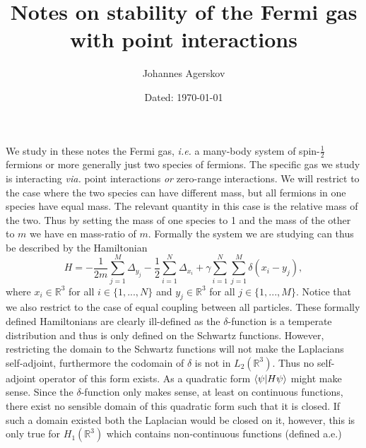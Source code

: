 \documentclass[a4paper,11pt]{article}
\author{Johannes Agerskov}
\date{Dated: \today}
\title{Notes on stability of the Fermi gas with point interactions}
\newcommand{\ie}{\emph{i.e.} }
\begin{document}
	\maketitle
	\tableofcontents
\vspace{1cm}
We study in these notes the Fermi gas, \ie a many-body system of spin-$ \frac{1}{2} $ fermions or more generally just two species of fermions. The specific gas we study is interacting \emph{via.} point interactions \emph{or} zero-range interactions. We will restrict to the case where the two species can have different mass, but all fermions in one species have equal mass. The relevant quantity in this case is the relative mass of the two. Thus by setting the mass of one species to 1 and the mass of the other to $ m $ we have en mass-ratio of $ m $. Formally the system we are studying can thus be described by the Hamiltonian \begin{equation}\label{Formal Hamiltonian}
H=-\frac{1}{2m}\sum_{j=1}^{M}\Delta_{y_j}-\frac{1}{2}\sum_{i=1}^{N}\Delta_{x_i}+\gamma\sum_{i=1}^{N}\sum_{j=1}^{M}\delta(x_i-y_j),
\end{equation}
where $ x_i\in\mathbb{R}^3 $ for all $ i\in\{1,...,N\} $ and $ y_j\in\mathbb{R}^3 $ for all $ j\in\{1,...,M\} $. Notice that we also restrict to the case of equal coupling between all particles. These formally defined Hamiltonians are clearly ill-defined as the $ \delta $-function is a  temperate distribution and thus is only defined on the Schwartz functions. However, restricting the domain to the Schwartz functions will not make the Laplacians self-adjoint, furthermore the codomain of $ \delta $ is not in $ L_2(\mathbb{R}^3) $. Thus no self-adjoint operator of this form exists.
As a quadratic form $ \braket{\psi|H\psi} $ might make sense. Since the $ \delta $-function only makes sense, at least on continuous functions, there exist no sensible domain of this quadratic form such that it is closed. If such a domain existed both the Laplacian would be closed on it, however, this is only true for $ H_1(\mathbb{R}^3) $ which contains non-continuous functions (defined a.e.)
\end{document}
